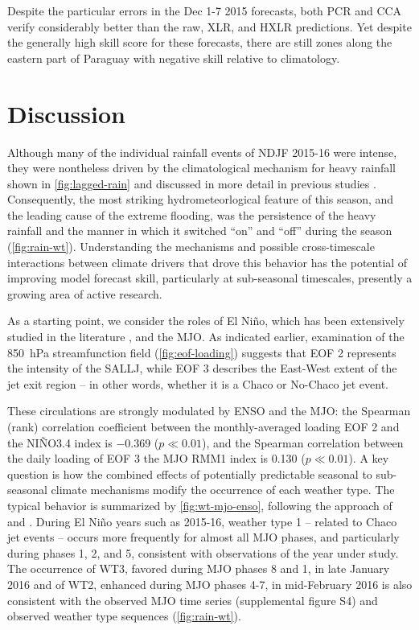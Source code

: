\documentclass[twocol]{ametsoc}
\begin{document}
Despite the particular errors in the Dec 1-7 2015 forecasts, both PCR and CCA verify considerably better than the raw, XLR, and HXLR predictions.
Yet despite the generally high skill score for these forecasts, there are still zones along the eastern part of Paraguay with negative skill relative to climatology.


\section{Discussion}
\label{sec:discussion}

Although many of the individual rainfall events of NDJF 2015-16 were intense, they were nontheless driven by the climatological mechanism for heavy rainfall shown in \cref{fig:lagged-rain} and discussed in more detail in previous studies \citep{Saulo:2007km,Salio:2007gd,Marengo2004,Velasco1987}.
Consequently, the most striking hydrometeorlogical feature of this season, and the leading cause of the extreme flooding, was the persistence of the heavy rainfall and the manner in which it switched ``on'' and ``off'' during the season (\cref{fig:rain-wt}).
Understanding the mechanisms and possible cross-timescale interactions between climate drivers that drove this behavior has the potential of improving model forecast skill, particularly at sub-seasonal timescales, presently a growing area of active research.

As a starting point, we consider the roles of El Ni\~{n}o, which has been extensively studied in the literature \citep{Carvalho2004,Velasco1987,Salio:2002ev,Bravo:2011et,Grimm2009}, and the MJO.
As indicated earlier, examination of the \SI{850}{\hecto\pascal} streamfunction field (\cref{fig:eof-loading}) suggests that EOF 2 represents the intensity of the SALLJ, while EOF 3 describes the East-West extent of the jet exit region -- in other words, whether it is a Chaco or No-Chaco jet event.

These circulations are strongly modulated by ENSO and the MJO: the Spearman (rank) correlation coefficient between the monthly-averaged loading EOF 2 and the NI\~NO3.4 index is \num{-.369} ($p \ll 0.01$), and the Spearman correlation between the daily loading of EOF 3 the MJO RMM1 index is \num{0.130} ($p \ll 0.01$).
A key question is how the combined effects of potentially predictable seasonal to sub-seasonal climate mechanisms modify the occurrence of each weather type.
The typical behavior is summarized by \cref{fig:wt-mjo-enso}, following the approach of \citet{Munoz2016} and \citet{Moron2015}.
During El Ni\~{n}o years such as 2015-16, weather type 1 -- related to Chaco jet events -- occurs more frequently for almost all MJO phases, and particularly during phases 1, 2, and 5, consistent with observations of the year under study.
The occurrence of WT3, favored during MJO phases 8 and 1, in late January 2016 and of WT2, enhanced during MJO phases 4-7, in mid-February 2016 is also consistent with the observed MJO time series (supplemental figure S4) and observed weather type sequences (\cref{fig:rain-wt}).
\end{document}
